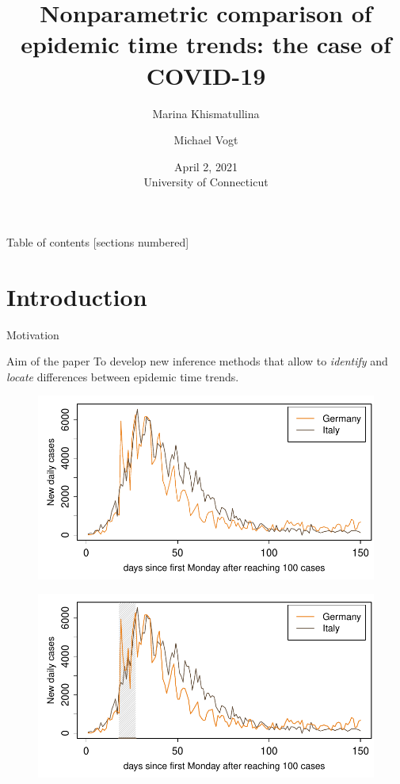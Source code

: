 \documentclass[10pt]{beamer}
\title{Nonparametric comparison of epidemic time trends: the case of COVID-19}
\date{April 2, 2021\\ University of Connecticut}
\author{Marina Khismatullina \and Michael Vogt}
\begin{document}
\maketitle

\begin{frame}{Table of contents}
  [sections numbered]
  \tableofcontents[hideallsubsections]
\end{frame}

\section{Introduction}


\begin{frame}{Motivation}

{ \begin{block}{Aim of the paper}
	To develop new inference methods that allow to \textit{identify} and \textit{locate} differences between epidemic time trends.
\end{block}}
	{\begin{figure}
    		\centering
    		\includegraphics[height=0.45\textheight]{plots/Germany_and_Italy.pdf}
  	\end{figure}}
	{\onslide<3>
	\vspace{-46,81mm}
	\begin{figure}
    		\centering
    		\includegraphics[height=0.45\textheight]{plots/Germany_and_Italy_1.pdf}

\end{figure}}
\end{frame}
\end{document}
